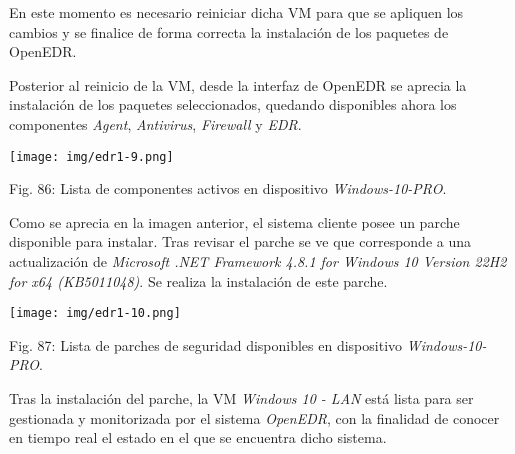 \documentclass[12pt,oneside,a4paper]{book}
\begin{document}
\hspace{20pt}
En este momento es necesario reiniciar dicha VM para que se apliquen los cambios y se finalice de forma correcta la instalación de los paquetes de OpenEDR.

\vspace{1em}

\hspace{20pt}
Posterior al reinicio de la VM, desde la interfaz de OpenEDR se aprecia la instalación de los paquetes seleccionados, quedando disponibles ahora los componentes \textit{Agent}, \textit{Antivirus}, \textit{Firewall} y \textit{EDR}. 

\vspace{2em}

\begin{center}
    \texttt{[image: img/edr1-9.png]}
    
\vspace{0.1em}
    
    Fig. 86: Lista de componentes activos en dispositivo \textit{Windows-10-PRO}.
\end{center}

\vspace{2em}

\hspace{20pt}
Como se aprecia en la imagen anterior, el sistema cliente posee un parche disponible para instalar. Tras revisar el parche se ve que corresponde a una actualización de \textit{Microsoft .NET Framework 4.8.1 for Windows 10 Version 22H2 for x64 (KB5011048)}. Se realiza la instalación de este parche.

\vspace{2em}

\begin{center}
    \texttt{[image: img/edr1-10.png]}
    
\vspace{0.1em}
    
    Fig. 87: Lista de parches de seguridad disponibles en dispositivo \textit{Windows-10-PRO}.
\end{center}

\vspace{2em}

\hspace{20pt}
Tras la instalación del parche, la VM \textit{Windows 10 - LAN} está lista para ser gestionada y monitorizada por el sistema \textit{OpenEDR}, con la finalidad de conocer en tiempo real el estado en el que se encuentra dicho sistema.
\end{document}
